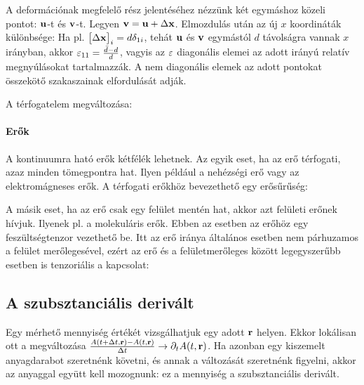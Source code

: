    A deformációnak megfelelő rész jelentéséhez nézzünk két egymáshoz közeli pontot: $\mathbf{u}$-t és $\mathbf{v}$-t. Legyen $\mathbf{v}=\mathbf{u}+\Delta \mathbf{x}$. Elmozdulás után az új $x$ koordináták különbsége: 
   Ha pl. $\big[\Delta\mathbf{x}\big]_i=d\delta_{1i}$, tehát $\mathbf{u}$ és $\mathbf{v}$ egymástól $d$ távolságra vannak $x$ irányban, akkor $\varepsilon_{11}=\frac{\bar d-d}{d}$, vagyis az $\varepsilon$ diagonális elemei az adott irányú relatív megnyúlásokat tartalmazzák. A nem diagonális elemek az adott pontokat összekötő szakaszainak elfordulását adják. 
   
   A térfogatelem megváltozása: 
   
   \paragraph{Erők} 
   
    A kontinuumra ható erők kétfélék lehetnek. Az egyik eset, ha az erő térfogati, azaz minden tömegpontra hat. Ilyen például a nehézségi erő vagy az elektromágneses erők. A térfogati erőkhöz bevezethető egy erősűrűség: 
    
    A másik eset, ha az erő csak egy felület mentén hat, akkor azt felületi erőnek hívjuk. Ilyenek pl. a molekuláris erők. Ebben az esetben az erőhöz egy feszültségtenzor vezethető be. Itt az erő iránya általános esetben nem párhuzamos a felület merőlegesével, ezért az erő és a felületmerőleges között legegyszerűbb esetben is tenzoriális a kapcsolat:
    
  \subsection{A szubsztanciális derivált}
   
   Egy mérhető mennyiség értékét vizsgálhatjuk egy adott $\mathbf{r}$ helyen. Ekkor lokálisan ott a megváltozása $\frac{A(t+\Delta t,\mathbf{r})-A(t,\mathbf{r})}{\Delta t}\to\partial_t A(t,\mathbf{r})$. Ha azonban egy kiszemelt anyagdarabot szeretnénk követni, és annak a változását szeretnénk figyelni, akkor az anyaggal együtt kell mozognunk:
   ez a mennyiség a szubsztanciális derivált. 
   
